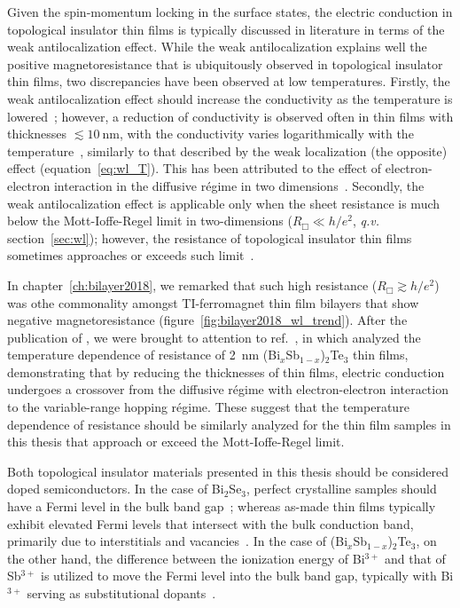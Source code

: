 Given the spin-momentum locking in the surface states, the electric conduction in topological insulator thin films is typically discussed in literature in terms of the weak antilocalization effect. While the weak antilocalization explains well the positive magnetoresistance that is ubiquitously observed in topological insulator thin films, two discrepancies have been observed at low temperatures. Firstly, the weak antilocalization effect should increase the conductivity as the temperature is lowered~\cite{bergmann1984}; however, a reduction of conductivity is observed often in thin films with thicknesses $\lesssim 10~\mathrm{nm}$, with the conductivity varies logarithmically with the temperature~\cite{Chen2011, Liu2011, Roy2013}, similarly to that described by the weak localization (the opposite) effect (equation~\ref{eq:wl_T}). This has been attributed to the effect of electron-electron interaction in the diffusive r\'egime in two dimensions~\cite{WL_ee}. Secondly, the weak antilocalization effect is applicable only when the sheet resistance is much below the Mott-Ioffe-Regel limit in two-dimensions ($R_\Box \ll h/e^2$, \textit{q.v.} section~\ref{sec:wl}); however, the resistance of topological insulator thin films sometimes approaches or exceeds such limit~\cite{TI_WAL_thickness, ZhangJS2011}.

In chapter~\ref{ch:bilayer2018}, we remarked that such high resistance ($R_\Box \gtrsim h/e^2$) was othe commonality amongst TI-ferromagnet thin film bilayers that show negative magnetoresistance (figure~\ref{fig:bilayer2018_wl_trend}). After the publication of \cite{bilayer2018}, we were brought to attention to ref.~\cite{liao2015}, in which \citeauthor{liao2015} analyzed the temperature dependence of resistance of \SI{2}{nm} (Bi$_x$Sb$_{1-x}$)$_2$Te$_3$ thin films, demonstrating that by reducing the thicknesses of thin films, electric conduction undergoes a crossover from the diffusive r\'egime with electron-electron interaction to the variable-range hopping r\'egime. These suggest that the temperature dependence of resistance should be similarly analyzed for the thin film samples in this thesis that approach or exceed the Mott-Ioffe-Regel limit.

Both topological insulator materials presented in this thesis should be considered doped semiconductors. In the case of Bi$_2$Se$_3$, perfect crystalline samples should have a Fermi level in the bulk band gap~\cite{TI_electronic_structure_zhang}; whereas as-made thin films typically exhibit elevated Fermi levels that intersect with the bulk conduction band, primarily due to interstitials and vacancies~\cite{TI_ARPES1, ARPES_thickness, zhangli2013, Zhanybek3, Fisher2010}. In the case of (Bi$_x$Sb$_{1-x}$)$_2$Te$_3$, on the other hand, the difference between the ionization energy of Bi$^{3+}$ and that of Sb$^{3+}$ is utilized to move the Fermi level into the bulk band gap, typically with Bi$^{3+}$ serving as substitutional dopants~\cite{ZhangJS2011, TI_electronic_structure_zhang}.

